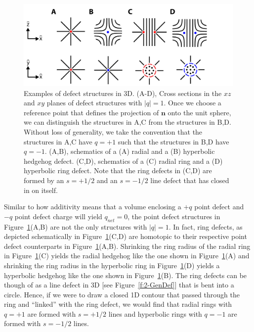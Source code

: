 \begin{figure}[h]
  \centering
  \includegraphics{figures/C2/Ch2-Figs_3DMeas.png}
  \caption{Examples of defect structures in 3D.
  (A-D), Cross sections in the $xz$ and $xy$ planes of defect structures with $|q| = 1$.
  Once we choose a reference point that defines the projection of $\mathbf{n}$ onto the unit sphere, we can distinguish the structures in A,C from the structures in B,D.
  Without loss of generality, we take the convention that the structures in A,C have $q = +1$ such that the structures in B,D have $q = -1$.
  (A,B), schematics of a (A) radial and a (B) hyperbolic hedgehog defect.
  (C,D), schematics of a (C) radial ring and a (D) hyperbolic ring defect.
  Note that the ring defects in (C,D) are formed by an $s = +1/2 $ and an $s = -1/2$ line defect that has closed in on itself.}\label{f:2-3DMeas}
\end{figure}

Similar to how additivity means that a volume enclosing a $+q$ point defect and $-q$ point defect charge will yield $q_{net} = 0$, the point defect structures in Figure~\ref{f:2-3DMeas}(A,B) are not the only structures with $|q| = 1$.
In fact, ring defects, as depicted schematically in Figure~\ref{f:2-3DMeas}(C,D) are homotopic to their respective point defect counterparts in Figure~\ref{f:2-3DMeas}(A,B).
Shrinking the ring radius of the radial ring in Figure~\ref{f:2-3DMeas}(C) yields the radial hedgehog like the one shown in Figure~\ref{f:2-3DMeas}(A) and shrinking the ring radius in the hyperbolic ring in Figure~\ref{f:2-3DMeas}(D) yields a hyperbolic hedgehog like the one shown in Figure~\ref{f:2-3DMeas}(B).
The ring defects can be though of as a line defect in 3D [see Figure~\ref{f:2-GenDef}] that is bent into a circle.
Hence, if we were to draw a closed 1D contour that passed through the ring and ``linked'' with the ring defect, we would find that radial rings with $q = +1$ are formed with $s = +1/2$ lines and hyperbolic rings with $q = -1$ are formed with $s = -1/2$ lines.

